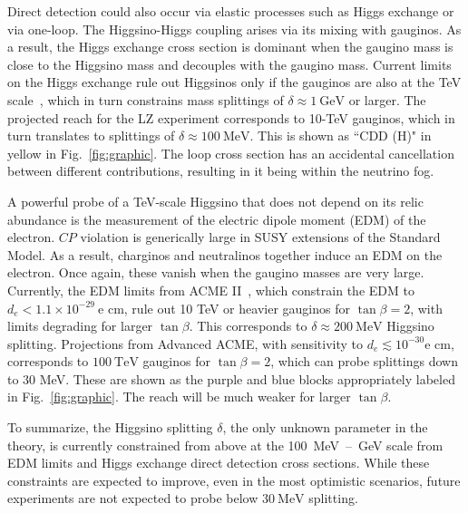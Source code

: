 \documentclass[aps,prd,amsmath,amssymb,10pt,letterpaper,balancelastpage,showpacs,superscriptaddress,nofootinbib,floatfix,notitlepage,longbibliography,twocolumn
]{revtex4-2}
\begin{document}
Direct detection could also occur via elastic processes such as Higgs exchange or via one-loop. The Higgsino-Higgs coupling arises via its mixing with gauginos. As a result, the Higgs exchange cross section is dominant when the gaugino mass is close to the Higgsino mass and decouples with the gaugino mass. Current limits on the Higgs exchange rule out Higgsinos only if the gauginos are also at the TeV scale~\cite{LastWIMP}, which in turn constrains mass splittings of $\delta\approx 1~\textrm{GeV}$ or larger. The projected reach for the LZ experiment corresponds to 10-TeV gauginos, which in turn translates to splittings of $\delta\approx 100~\textrm{MeV}$. This is shown as ``CDD (H)" in yellow in Fig.~\ref{fig:graphic}.
The loop cross section has an accidental cancellation between different contributions, resulting in it being within the neutrino fog. 

A powerful probe of a TeV-scale Higgsino that does not depend on its relic abundance is the measurement of the electric dipole moment (EDM) of the electron. $CP$ violation is generically large in SUSY extensions of the Standard Model. As a result, charginos and neutralinos together induce an EDM on the electron. Once again, these vanish when the gaugino masses are very large. Currently, the EDM limits from ACME II~\cite{acme2018improved,Co:2021ion}, which constrain the EDM to $d_e < 1.1 \times 10^{-29}~\textrm{e~cm}$, rule out 10 TeV or heavier gauginos for $\tan \beta=2$, with limits degrading for larger $\tan \beta$. 
This corresponds to $\delta \approx 200 ~\text{MeV}$ Higgsino splitting. Projections from Advanced ACME, with sensitivity to $d_e \lesssim 10^{-30} \textrm{e~cm}$, corresponds to $100~\textrm{TeV}$ gauginos for $\tan \beta=2$, which can probe splittings down to 30 MeV. These are shown as the purple and blue blocks appropriately labeled in Fig.~\ref{fig:graphic}. The reach will be much weaker for larger $\tan \beta$. 

To summarize, the Higgsino splitting $\delta$, the only unknown parameter in the theory, is currently constrained  from above at the 100~MeV~--~GeV scale from EDM limits and Higgs exchange direct detection cross sections.  While these constraints are expected to improve, even in the most optimistic scenarios, future experiments are not expected to probe below $30~\textrm{MeV}$ splitting. 
\end{document}
